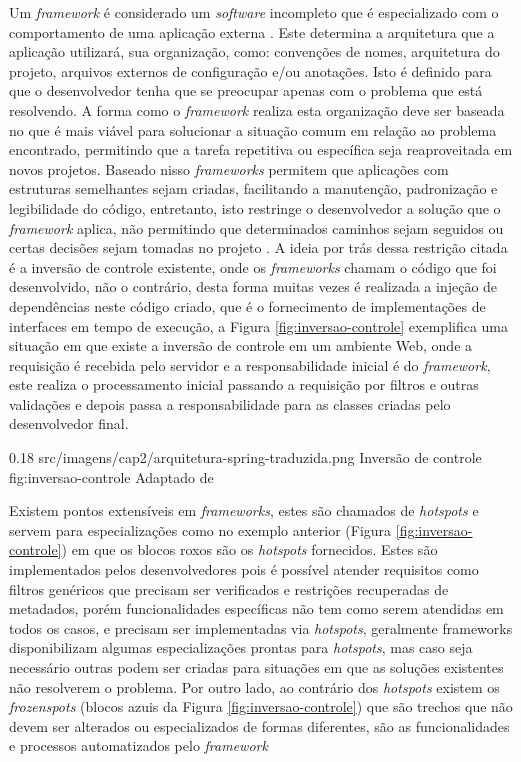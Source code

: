 \par Um \textit{framework} é considerado um \textit{software} incompleto que é especializado com o comportamento de uma aplicação externa \cite{johnson1988designing}. Este determina a arquitetura que a aplicação utilizará, sua organização, como: convenções de nomes, arquitetura do projeto, arquivos externos de configuração e/ou anotações. Isto é definido para que o desenvolvedor tenha que se preocupar apenas com o problema que está resolvendo. A forma como o \textit{framework} realiza esta organização deve ser baseada no que é mais viável para solucionar a situação comum em relação ao problema encontrado, permitindo que a tarefa repetitiva ou específica seja reaproveitada em novos projetos.
Baseado nisso \textit{frameworks} permitem que aplicações com estruturas semelhantes sejam criadas, facilitando a manutenção, padronização e legibilidade do código, entretanto, isto restringe o desenvolvedor a solução que o \textit{framework} aplica, não permitindo que determinados caminhos sejam seguidos ou certas decisões sejam tomadas no projeto \cite{gamma2009padroes}. A ideia por trás dessa restrição citada é a inversão de controle existente, onde os \textit{frameworks} chamam o código que foi desenvolvido, não o contrário, desta forma muitas vezes é realizada a injeção de dependências neste código criado, que é o fornecimento de implementações de interfaces em tempo de execução, a Figura \ref{fig:inversao-controle} exemplifica uma situação em que existe a inversão de controle em um ambiente Web, onde a requisição é recebida pelo servidor e a responsabilidade inicial é do \textit{framework}, este realiza o processamento inicial passando a requisição por filtros e outras validações e depois passa a responsabilidade para as classes criadas pelo desenvolvedor final.

\begin{image}
{0.18} %
{src/imagens/cap2/arquitetura-spring-traduzida.png} %
{Inversão de controle} %
{fig:inversao-controle} %
{Adaptado de } %
\end{image}

\par Existem pontos extensíveis em \textit{frameworks}, estes são chamados de \textit{hotspots} e servem para especializações como no exemplo anterior (Figura \ref{fig:inversao-controle}) em que os blocos roxos são os \textit{hotspots} fornecidos. Estes são implementados pelos desenvolvedores pois é possível atender requisitos como filtros genéricos que precisam ser verificados e restrições recuperadas de metadados, porém funcionalidades específicas não tem como serem atendidas em todos os casos, e precisam ser implementadas via \textit{hotspots}, geralmente frameworks disponibilizam algumas especializações prontas para \textit{hotspots}, mas caso seja necessário outras podem ser criadas para situações em que as soluções existentes não resolverem o problema. Por outro lado, ao contrário dos \textit{hotspots} existem os \textit{frozenspots} (blocos azuis da Figura \ref{fig:inversao-controle}) que são trechos que não devem ser alterados ou especializados de formas diferentes, são as funcionalidades e processos automatizados pelo \textit{framework} \cite{markiewicz2001object}

